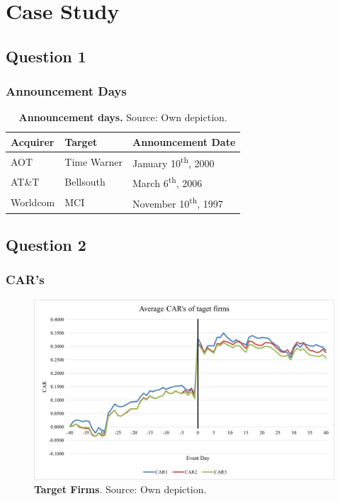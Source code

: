 \documentclass{beamer}
\begin{document}
\section{Case Study}
\subsection{Question 1}
\begin{frame}
\frametitle{Announcement Days}
\begin{table}[H]
	\centering
	\begin{tabular}{|l|l|l|}
		\toprule
		Acquirer & Target & Announcement Date \\\toprule
		AOT& Time Warner & January 10\textsuperscript{th}, 2000 \\
		AT\&T& Bellsouth& March 6\textsuperscript{th}, 2006\\
		Worldcom& MCI& November 10\textsuperscript{th}, 1997\\ \hline
	\end{tabular}
	\caption{\footnotesize \textbf{Announcement days.} {\footnotesize Source: Own depiction.}}
	\label{aanounce}
\end{table}
\end{frame}

\subsection{Question 2}
\begin{frame}
\frametitle{CAR's}
	\begin{figure}[H]
	\includegraphics[scale=0.35]{images/Bild1.png}
	\vspace{2mm}
	\caption[Target Firms]{{\footnotesize \textbf{Target Firms}. 
			{Source: Own depiction.}}}
	\normalsize
	\label{fig:bildli}
\end{figure}

\end{frame}
\end{document}
